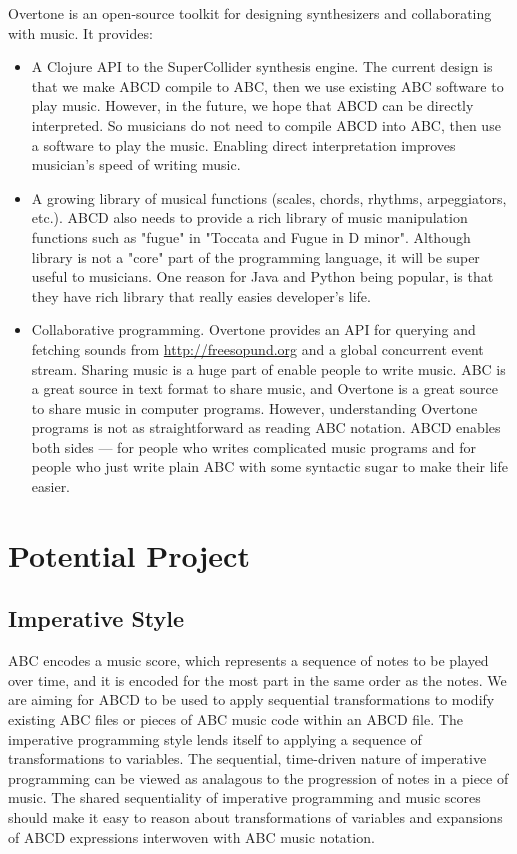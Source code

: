 Overtone is an open-source toolkit for designing synthesizers and collaborating with music. It provides\cite{Aaron16}:
\begin{itemize}
\item A Clojure API to the SuperCollider synthesis engine. The current design is that we make ABCD compile to ABC, then we use existing ABC software to play music. However, in the future, we hope that ABCD can be directly interpreted. So musicians do not need to compile ABCD into ABC, then use a software to play the music. Enabling direct interpretation improves musician's speed of writing music.
\item A growing library of musical functions (scales, chords, rhythms, arpeggiators, etc.). ABCD also needs to provide a rich library of music manipulation functions such as "fugue" in "Toccata and Fugue in D minor". Although library is not a "core" part of the programming language, it will be super useful to musicians. One reason for Java and Python being popular, is that they have rich library that really easies developer's life.
\item Collaborative programming. Overtone provides an API for querying and fetching sounds from \url{http://freesopund.org} and a global concurrent event stream\cite{Aaron16}. Sharing music is a huge part of enable people to write music. ABC is a great source in text format to share music, and Overtone is a great source to share music in computer programs. However, understanding Overtone programs is not as straightforward as reading ABC notation. ABCD enables both sides --- for people who writes complicated music programs and for people who just write plain ABC with some syntactic sugar to make their life easier.
\end{itemize}

\section{Potential Project}

\subsection{Imperative Style}
    ABC encodes a music score, which represents a sequence of notes to be played over time, and it is encoded for the most part in the same order as the notes. We are aiming for ABCD to be used to apply sequential transformations to modify existing ABC files or pieces of ABC music code within an ABCD file. The imperative programming style lends itself to applying a sequence of transformations to variables. The sequential, time-driven nature of imperative programming can be viewed as analagous to the progression of notes in a piece of music. The shared sequentiality of imperative programming and music scores should make it easy to reason about transformations of variables and expansions of ABCD expressions interwoven with ABC music notation.

